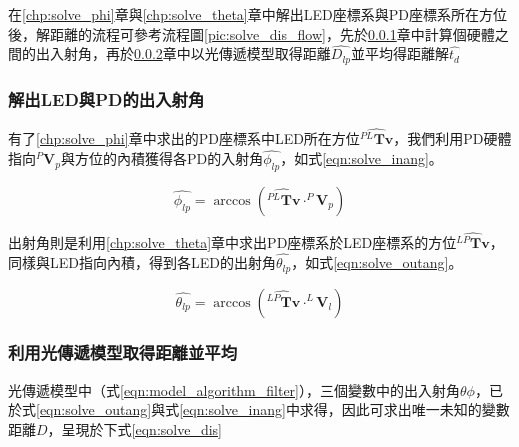     在\ref{chp:solve_phi}章與\ref{chp:solve_theta}章中解出LED座標系與PD座標系所在方位後，解距離的流程可參考流程圖\ref{pic:solve_dis_flow}，先於\ref{chp:solve_ang}章中計算個硬體之間的出入射角，再於\ref{chp:dis_average}章中以光傳遞模型取得距離$\hat{D_{lp}}$並平均得距離解$\hat{t_d}$
    

        


        \subsubsection{解出LED與PD的出入射角}
        \label{chp:solve_ang}

        有了\ref{chp:solve_phi}章中求出的PD座標系中LED所在方位$\hat{{^{PL}\boldsymbol{Tv}}}$，我們利用PD硬體指向$^P\boldsymbol{V}_p$與方位的內積獲得各PD的入射角$\hat{\phi_{lp}}$，如式\ref{eqn:solve_inang}。
        
        \begin{equation}
            \label{eqn:solve_inang}
            \hat{\phi_{lp}} = \arccos(\hat{{^{PL}\boldsymbol{Tv}}}\cdot ^P\boldsymbol{V}_p)
        \end{equation}
        
        出射角則是利用\ref{chp:solve_theta}章中求出PD座標系於LED座標系的方位$\hat{{^{LP}\boldsymbol{Tv}}}$，同樣與LED指向內積，得到各LED的出射角$\hat{\theta_{lp}}$，如式\ref{eqn:solve_outang}。

        \begin{equation}
            \label{eqn:solve_outang}
            \hat{\theta_{lp}} = \arccos(\hat{{^{LP}\boldsymbol{Tv}}}\cdot ^L\boldsymbol{V}_l)
        \end{equation}

        \subsubsection{利用光傳遞模型取得距離並平均}
        \label{chp:dis_average}

        光傳遞模型中（式\ref{eqn:model_algorithm_filter}），三個變數中的出入射角$\theta\phi$，已於式\ref{eqn:solve_outang}與式\ref{eqn:solve_inang}中求得，因此可求出唯一未知的變數距離$D$，呈現於下式\ref{eqn:solve_dis}


